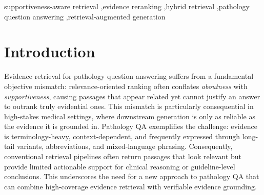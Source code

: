 \documentclass[preprint,12pt,a4paper]{elsarticle}
\begin{document}
\begin{frontmatter}
\begin{abstract}
Evidence retrieval for pathology question answering suffers from a fundamental objective mismatch: relevance-oriented ranking often conflates aboutness with supportiveness, causing passages that appear related yet cannot justify an answer to outrank truly evidential ones. We propose \textsc{YpathRAG}, a supportiveness-first retrieval and reranking framework. In the first stage, \textsc{YpathRAG} uses dense retrieval as the primary channel and augments it with a lexicon-guided sparse retriever to improve robustness to terminological variation and evidence reachability. In the second stage, \textsc{YpathRAG} introduces a \emph{Supportive Evidence Verifier} (SEV) that reranks a fixed candidate pool without increasing retrieval depth by fusing retrieval scores with dual-head predictions to jointly model whether a passage is supportive and how strongly it supports the query. We evaluate \textsc{YpathRAG} along three complementary axes: corpus-level retrieval on a 1.53M-passage pathology corpus, a dedicated reranking benchmark with targeted confusable negatives, and a downstream QA benchmark. On \textsc{YpathR}, \textsc{YpathRAG} achieves 0.9864 Precision@5, and on corpus-level retrieval it improves nDCG@10 from 0.3368 to 0.3972 over hybrid retrieval. Across settings, \textsc{YpathRAG} improves the supportiveness and coverage of top-ranked evidence without increasing retrieval depth.
\end{abstract}

\begin{keyword}
supportiveness-aware retrieval \sep evidence reranking \sep hybrid retrieval \sep pathology question answering \sep retrieval-augmented generation
\end{keyword}

\end{frontmatter}

\section{Introduction}
Evidence retrieval for pathology question answering suffers from a fundamental objective mismatch: relevance-oriented ranking often conflates \emph{aboutness} with \emph{supportiveness}, causing passages that appear related yet cannot justify an answer to outrank truly evidential ones. This mismatch is particularly consequential in high-stakes medical settings, where downstream generation is only as reliable as the evidence it is grounded in. Pathology QA exemplifies the challenge: evidence is terminology-heavy, context-dependent, and frequently expressed through long-tail variants, abbreviations, and mixed-language phrasing. Consequently, conventional retrieval pipelines often return passages that look relevant but provide limited actionable support for clinical reasoning or guideline-level conclusions. This underscores the need for a new approach to pathology QA that can combine high-coverage evidence retrieval with verifiable evidence grounding.
\end{document}
